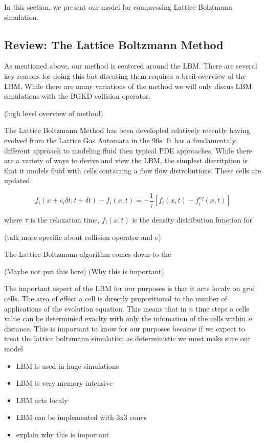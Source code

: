 \documentclass{article}
\begin{document}
In this section, we present our model for compressing Lattice Bolztmann simulation.

\subsection{Review: The Lattice Boltzmann Method}

As mentioned above, our method is centered around the LBM. There are several key reasons for doing this but discusing them requires a breif overview of the LBM. While there are many variations of the method we will only discus LBM simulations with the BGKD collision operator. 

(high level overview of method)

The Lattice Boltzmann Method has been developled relatively recently having evolved from the Lattice Gas Automata in the 90s. It has a fundamentaly different approach to modeling fluid then typical PDE approaches. While there are a variety of ways to derive and view the LBM, the simplest discritption is that it models fluid with cells containing a flow flow distrobutions. These cells are updated 

\begin{equation}
  f_i(x+c_i \delta{t}, t+ \delta{t}) - f_i(x,t) = -\frac{1}{\tau} [f_i(x,t) - f_i^{eq}(x,t)]
\end{equation}

where $\tau$ is the relaxation time, $f_i(x,t)$ is the density distribution function for

(talk more specific about collision operator and e)

The Lattice Boltzmann algorithm comes down to the 

(Maybe not put this here)
(Why this is important)

The important aspect of the LBM for our purposes is that it acts localy on grid cells. The area of effect a cell is directly proporitional to the number of applications of the evolution equation. This means that in $n$ time steps a cells value can be determinied exaclty with only the infomation of the cells within $n$ distance. This is important to know for our purposes becasue if we expect to treat the lattice boltzmann simulation as deterministic we must make sure our model 

\begin{itemize}
  \item LBM is used in huge simulations
  \item LBM is very memory intensive
  \item LBM acts localy
  \item LBM can be implemented with 3x3 convs
  \item explain why this is important
\end{itemize}
\end{document}

